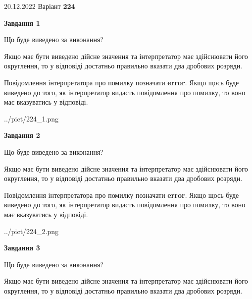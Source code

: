 \documentclass[12pt, ukrainian]{article}
\begin{document}
{20.12.2022 Варіант \No \textbf { 224 }\par}
{
\begin {Large}

{\begin {center}\textbf{Завдання 1}\end {center}}\par
Що буде виведено за виконання? \par

Якщо має бути виведено дійсне значення та інтерпретатор має здійснювати його округлення, 
то у відповіді достатньо правильно вказати два дробових розряди.

Повідомлення інтерпретатора про помилку позначати \textbf{error}.
Якщо щось буде виведено до того, як інтерпретатор видасть повідомлення про помилку, 
то воно має вказуватись у відповіді. \par

\begin{center}
	{../pict/224_1.png}
\end{center}
\newpage

{\begin {center}\textbf{Завдання 2}\end {center}}\par
Що буде виведено за виконання? \par

Якщо має бути виведено дійсне значення та інтерпретатор має здійснювати його округлення, 
то у відповіді достатньо правильно вказати два дробових розряди.

Повідомлення інтерпретатора про помилку позначати \textbf{error}.
Якщо щось буде виведено до того, як інтерпретатор видасть повідомлення про помилку, 
то воно має вказуватись у відповіді. \par

\begin{center}
	{../pict/224_2.png}
\end{center}
\newpage

{\begin {center}\textbf{Завдання 3}\end {center}}\par
Що буде виведено за виконання? \par

Якщо має бути виведено дійсне значення та інтерпретатор має здійснювати його округлення, 
то у відповіді достатньо правильно вказати два дробових розряди.


\end{Large}}
\end{document}
